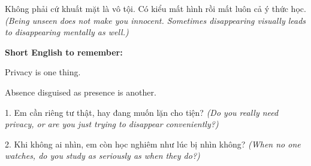 \begin{baihoc}
Không phải cứ khuất mặt là vô tội. Có kiểu mất hình rồi mất luôn cả ý thức học.
\textit{(Being unseen does not make you innocent. Sometimes disappearing visually leads to disappearing mentally as well.)}
\end{baihoc}

\begin{ghinhoanh}
\textbf{Short English to remember:}

Privacy is one thing.

Absence disguised as presence is another.
\end{ghinhoanh}

\begin{tuhocnhanh}
1. Em cần riêng tư thật, hay đang muốn lặn cho tiện? \textit{(Do you really need privacy, or are you just trying to disappear conveniently?)}

2. Khi không ai nhìn, em còn học nghiêm như lúc bị nhìn không? \textit{(When no one watches, do you study as seriously as when they do?)}
\end{tuhocnhanh}
\ngancach
